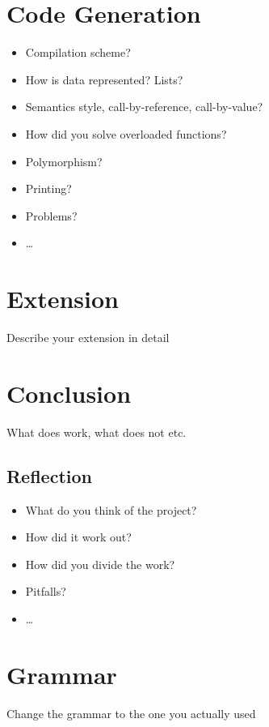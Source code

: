 \documentclass{report}
\begin{document}
\chapter{Code Generation}
\begin{itemize}
	\item Compilation scheme?
	\item How is data represented? Lists?
	\item Semantics style, call-by-reference, call-by-value?
	\item How did you solve overloaded functions?
	\item Polymorphism?
	\item Printing?
	\item Problems?
	\item\ldots
\end{itemize}

\chapter{Extension}
Describe your extension in detail

\chapter{Conclusion}
What does work, what does not etc.

\section{Reflection}
\begin{itemize}
	\item What do you think of the project?
	\item How did it work out?
	\item How did you divide the work?
	\item Pitfalls?
	\item \ldots
\end{itemize}

\appendix
\chapter{Grammar}
Change the grammar to the one you actually used
\end{document}

